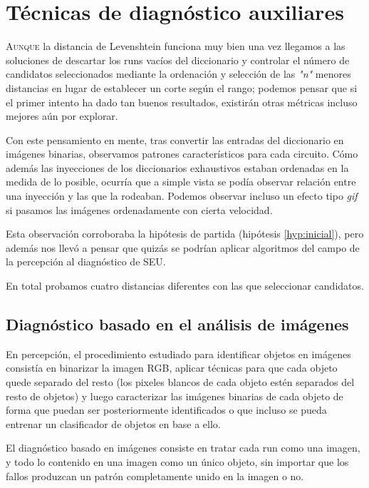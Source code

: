 \chapter{Técnicas de diagnóstico auxiliares}
\label{ch:TecnicasAuxiliares}

\lettrine[lraise=-0.1, lines=2, loversize=0.2]{A}{unque} la distancia de
Levenshtein funciona muy bien una vez llegamos a las soluciones de descartar los 
runs vacíos del diccionario y controlar el número de candidatos seleccionados 
mediante la ordenación y selección de las \textit{"n"} menores distancias en lugar
de establecer un corte según el rango; podemos pensar que si el primer intento ha
dado tan buenos resultados, existirán otras métricas incluso mejores aún por
explorar.

Con este pensamiento en mente, tras convertir las entradas del diccionario en
imágenes binarias, observamos patrones característicos para cada circuito. Cómo
además las inyecciones de los diccionarios exhaustivos estaban ordenadas en la
medida de lo posible, ocurría que a simple vista se podía observar relación entre
una inyección y las que la rodeaban. Podemos observar incluso un efecto tipo
\textit{gif} si pasamos las imágenes ordenadamente con cierta velocidad.

Esta observación corroboraba la hipótesis de partida (hipótesis
\ref{hyp:inicial}), pero además nos llevó a pensar que quizás se podrían aplicar
algoritmos del campo de la percepción al diagnóstico de \gls{SEU}.

En total probamos cuatro distancias diferentes con las que seleccionar candidatos.

\section{Diagnóstico basado en el análisis de imágenes}
\label{sec:HuDist}
En percepción, el procedimiento estudiado para identificar objetos en
imágenes consistía en binarizar la imagen RGB, aplicar técnicas para que cada
objeto quede separado del resto (los pixeles blancos de cada objeto estén
separados del resto de objetos) y luego caracterizar las imágenes binarias de cada
objeto de forma que puedan ser posteriormente identificados o que incluso se pueda
entrenar un clasificador de objetos en base a ello.

El diagnóstico basado en imágenes consiste en tratar cada run como una imagen, 
y todo lo contenido en una imagen como un único objeto, sin importar que los
fallos produzcan un patrón completamente unido en la imagen o no.

